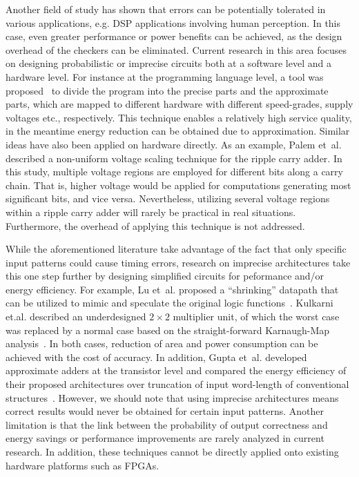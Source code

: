 \documentclass[prodmode,acmtrets]{acmsmall} %
\begin{document}
Another field of study has shown that errors can be potentially tolerated in various applications, e.g. DSP applications involving human perception. In this case, even greater performance or power benefits can be achieved, as the design overhead of the checkers can be eliminated. Current research in this area focuses on designing probabilistic or imprecise circuits both at a software level and a hardware level. For instance at the programming language level, a tool was proposed~\cite{EnerJ2011Uwash,Truffle2012Uwash} to divide the program into the precise parts and the approximate parts, which are mapped to different hardware with different speed-grades, supply voltages etc., respectively. This technique enables a relatively high service quality, in the meantime energy reduction can be obtained due to approximation. Similar ideas have also been applied on hardware directly. As an example, Palem et~al.~\cite{NonUniformScaling} described a non-uniform voltage scaling technique for the ripple carry adder. In this study, multiple voltage regions are employed for different bits along a carry chain. That is, higher voltage would be applied for computations generating most significant bits, and vice versa. Nevertheless, utilizing several voltage regions within a ripple carry adder will rarely be practical in real situations. Furthermore, the overhead of applying this technique is not addressed.

While the aforementioned literature take advantage of the fact that only specific input patterns could cause timing errors, research on imprecise architectures take this one step further by designing simplified circuits for peformance and/or energy efficiency. For example, Lu et~al. proposed a ``shrinking'' datapath that can be utilized to mimic and speculate the original logic functions~\cite{IntelSpeeding}. Kulkarni et.al. described an underdesigned $2\times2$ multiplier unit, of which the worst case was replaced by a normal case based on the straight-forward Karnaugh-Map analysis~\cite{Undersigned2x2multiplier}. In both cases, reduction of area and power consumption can be achieved with the cost of accuracy. In addition, Gupta et~al. developed approximate adders at the transistor level and compared the energy efficiency of their proposed architectures over truncation of input word-length of conventional structures~\cite{Gupta2013TransCADICS}. However, we should note that using imprecise architectures means correct results would never be obtained for certain input patterns. Another limitation is that the link between the probability of output correctness and energy savings or performance improvements are rarely analyzed in current research. In addition, these techniques cannot be directly applied onto existing hardware platforms such as FPGAs.
\end{document}

